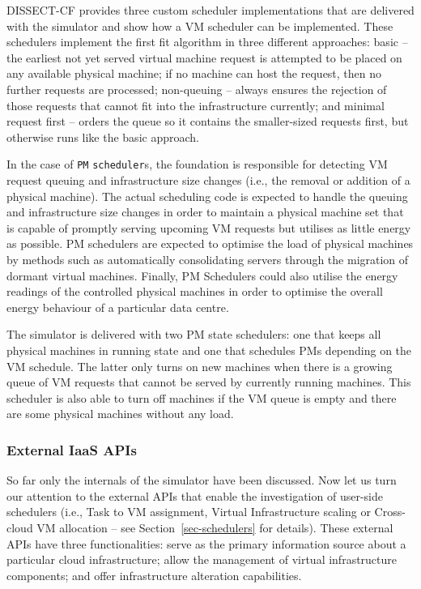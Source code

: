 \documentclass[sort, compress, 5p]{elsarticle}
\begin{document}
DISSECT-CF provides three custom scheduler implementations that are delivered with the simulator and show how a VM scheduler can be implemented. These schedulers implement the first fit algorithm in three different approaches:  basic -- the earliest not yet served virtual machine request is attempted to be placed on any available physical machine; if no machine can host the request, then no further requests are processed;  non-queuing  -- always ensures the rejection of those requests that cannot fit into the infrastructure currently; and  minimal request first -- orders the queue so it contains the smaller-sized requests first, but otherwise runs like the basic approach.

In the case of \verb+PM+ \verb+scheduler+s, the foundation is responsible for detecting VM request queuing and infrastructure size changes (i.e., the removal or addition of a physical machine). The actual scheduling code is expected to handle the queuing and infrastructure size changes in order to maintain a physical machine set that is capable of promptly serving upcoming VM requests but utilises as little energy as possible. PM schedulers are expected to optimise the load of physical machines by methods such as automatically consolidating servers through the migration of dormant virtual machines. Finally, PM Schedulers could also utilise the energy readings of the controlled physical machines in order to optimise the overall energy behaviour of a particular data centre.

The simulator is delivered with two PM state schedulers: one that keeps all physical machines in running state and one that schedules PMs depending on the VM schedule. The latter only turns on new machines when there is a growing queue of VM requests that cannot be served by currently running machines. This scheduler is also able to turn off machines if the VM queue is empty and there are some physical machines without any load.

\subsubsection{External IaaS APIs} \label{SEC-UI}

So far only the internals of the simulator have been discussed. Now let us turn our attention to the external APIs that enable the investigation of user-side schedulers (i.e., Task to VM assignment, Virtual Infrastructure scaling or Cross-cloud VM allocation -- see Section~\ref{sec-schedulers} for details). These external APIs have three functionalities:  serve as the primary information source about a particular cloud infrastructure;  allow the management of virtual infrastructure components; and  offer infrastructure alteration capabilities. 
\end{document}
